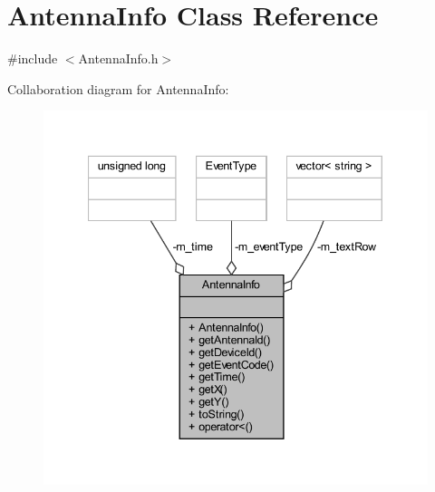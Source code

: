 \hypertarget{class_antenna_info}{}\section{Antenna\+Info Class Reference}
\label{class_antenna_info}


{\ttfamily \#include $<$Antenna\+Info.\+h$>$}



Collaboration diagram for Antenna\+Info\+:\nopagebreak
\begin{figure}[H]
\begin{center}
\leavevmode
\includegraphics[width=340pt]{class_antenna_info__coll__graph}
\end{center}
\end{figure}
